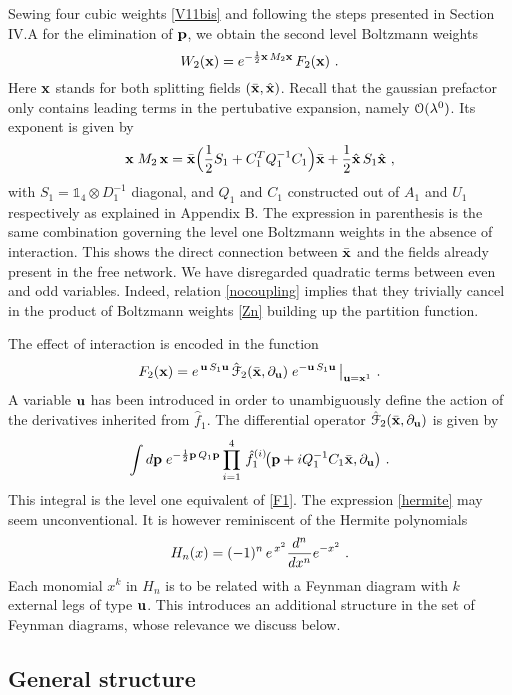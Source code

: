 \documentclass[a4paper,preprintnumbers,nofootinbib,twocolumn]{quantumarticle}
\newcommand{\be}{\begin{equation}} \newcommand{\ee}{\end{equation}}
\newcommand{\id}{\mathds 1}
\begin{document}
Sewing four cubic weights \eqref{V11bis} and following the steps presented in Section IV.A for the elimination of ${\bf p}$, we obtain the second level Boltzmann weights 
\be
W_2({\bf x})= e^{-{1 \over 2} {\bf x} \, M_2 {\bf x} } \, F_2 ({\bf x}) \ .
\ee
Here ${\bf x}$ stands for both splitting fields  $({\bar {\bf x}}, {\hat {\bf x}} )$. Recall that the gaussian prefactor only contains leading terms in the pertubative expansion, namely ${\cal O}(\lambda^0)$.
Its exponent is given by
\be
{\bf x} \; M_2 \,{\bf x} =
{\bar {\bf x}}\Big( {1 \over 2} S_1 + C_1^T Q_1^{-1} C_1 \Big){\bar {\bf x}} +{1 \over 2} {\hat {\bf x}} \,S_1{\hat {\bf x}} \ ,
\label{M2}
\ee
with $S_1 =\id_4 \otimes D_1^{-1}$ diagonal, and $Q_1$ and $C_1$ constructed out of $A_1$ and $U_1$ respectively as explained in Appendix B. 
The expression in parenthesis 
is the same combination governing the level one Boltzmann weights in the absence of interaction. This shows the direct 
connection between ${\bar {\bf x}}$ and the fields already present in the free network.
We have disregarded quadratic terms between even and odd variables. 
Indeed, relation \eqref{nocoupling} implies that they trivially cancel in the product of Boltzmann weights \eqref{Zn} building up the partition function.


The effect of interaction is encoded in the function
\be
F_2({\bf x})= 
 e^{\,{\bf u} \, S_1 {\bf u}}\, {\hat {\cal F}}_2({\bar {\bf x}},\partial_{{\bf u}} ) \; e^{-{\bf u} \, S_1 {\bf u}} \, \big|_{{\bf u}={\bf x}^1} \ .
\label{hermite}
\ee
A variable ${\bf u}$ has been introduced in order to unambiguously define the action of the derivatives inherited from ${\hat f}_1$.
The differential operator ${\hat {\cal F}}_2({\bar {\bf x}},\partial_{{\bf u}} )$ is given by
\be
 \int d{\bf p} \; e^{-{1 \over 2} {\bf p} \, Q_1 {\bf p}}  \prod_{i=1}^4 \, {\hat f}_1^{(i)}\! \big({\bf p} + i Q_1^{-1} C_1 {\bar {\bf x}},\partial_{{\bf u}} \big) \ .
\label{F2} 
\ee
This integral is the level one equivalent of \eqref{F1}. 
The expression \eqref{hermite} may seem unconventional. It is however reminiscent of the Hermite polynomials
\be
H_n(x)= (-1)^n \,e^{\,x^2} {d^n \over dx^n} e^{-x^2} \ .
\label{her}
\ee
Each monomial $x^k$ in $H_n$ is to be related with a Feynman diagram with $k$ external legs of type ${\bf u}$. 
This introduces an additional structure in the set of Feynman diagrams, whose relevance we discuss below.

\subsection{General structure}
\end{document}
